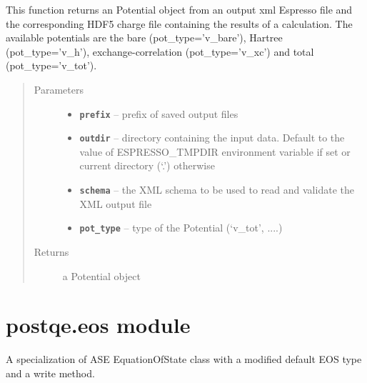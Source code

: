 \documentclass[letterpaper,10pt,english]{sphinxmanual}
\begin{document}

\begin{fulllineitems}
\label{postqe:postqe.api.get_label}
\end{fulllineitems}


\begin{fulllineitems}
\label{postqe:postqe.api.get_potential}
This function returns an Potential object from an output xml Espresso file and
the corresponding HDF5 charge file containing the results of a calculation.
The available potentials are the bare (pot\_type='v\_bare'), Hartree (pot\_type='v\_h'),
exchange-correlation (pot\_type='v\_xc') and total (pot\_type='v\_tot').
\begin{quote}\begin{description}
\item[{Parameters}] \leavevmode\begin{itemize}
\item {} 
\textbf{\texttt{prefix}} -- prefix of saved output files

\item {} 
\textbf{\texttt{outdir}} -- directory containing the input data. Default to the value of
ESPRESSO\_TMPDIR environment variable if set or current directory (`.') otherwise

\item {} 
\textbf{\texttt{schema}} -- the XML schema to be used to read and validate the XML output file

\item {} 
\textbf{\texttt{pot\_type}} -- type of the Potential (`v\_tot', ....)

\end{itemize}

\item[{Returns}] \leavevmode
a Potential object

\end{description}\end{quote}

\end{fulllineitems}



\section{postqe.eos module}
\label{postqe:module-postqe.eos}\label{postqe:postqe-eos-module}
A specialization of ASE EquationOfState class with a modified default EOS type and a write method.
\end{document}
